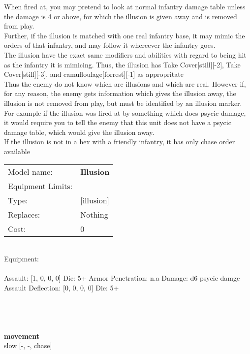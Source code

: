 \noindent When fired at, you may pretend to look at normal infantry damage table unless the damage is 4 or above, for which the illusion is given away and is removed from play.\\ 
Further, if the illusion is matched with one real infantry base, it may mimic the orders of that infantry, and may follow it whereever the infantry goes.\\ 
The illusion have the exact same modifiers and abilities with regard to being hit as the infantry it is mimicing. Thus, the illusion has Take Cover[still][-2], Take Cover[still][-3], and camufloulage[forrest][-1] as appropritate \\ 
 Thus the enemy do not know which are illusions and which are real. However if, for any reason, the enemy gets information which gives the illusion away, the illusion is not removed from play, but must be identified by an illusion marker. For example if the illusion was fired at by something which does psycic damage, it would require you to tell the enemy that this unit does not have a psycic damage table, which would give the illusion away.\\ 
If the illusion is not in a hex with a friendly infantry, it has only chase order available\\ 


\noindent
\begin{tabular}{ll}
Model name: &{\bf Illusion } \\
Equipment Limits: & \\
Type: &[illusion] \\
Replaces: &Nothing \\
Cost: & 0\\
\end{tabular}
\ \\
Equipment:  \\
\ \\
Assault: [1, 0, 0, 0] Die: 5+ Armor Penetration: n.a Damage: d6 psycic damge \\
Assault Deflection: [0, 0, 0, 0] Die: 5+\\
\indent  
\ \\

\ \\
 
\ \\



\ \\ {\bf movement } \\
slow [-, -, chase] \\


